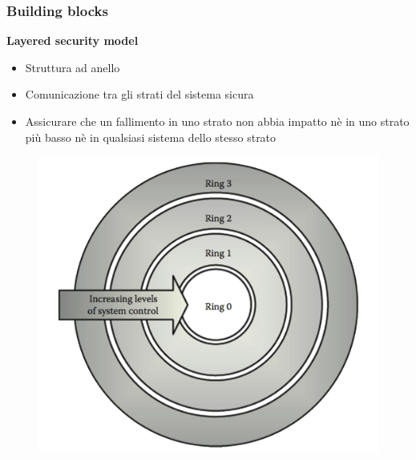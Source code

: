 \begin{frame}
  \frametitle{Building blocks}
  \textbf{Layered security model}
  \begin{itemize}
  \item Struttura ad anello 
  \item Comunicazione tra gli strati del sistema sicura
  \item Assicurare che un fallimento in uno strato non abbia impatto nè in uno strato più basso nè in qualsiasi sistema dello stesso strato
  \end{itemize}
    	\begin{figure}[h] 
		\includegraphics[scale=0.1]{imgs/ring.png}
	\end{figure}
\end{frame}


